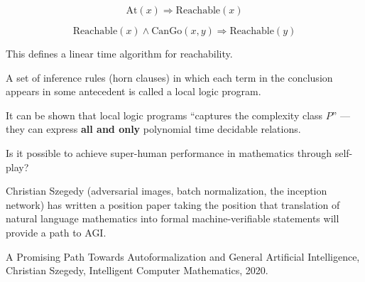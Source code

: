 {\vfill
$$\mathrm{At}(x) \Rightarrow \mathrm{Reachable}(x)$$

\vfill
$$\mathrm{Reachable}(x) \wedge \mathrm{CanGo}(x,y) \Rightarrow \mathrm{Reachable}(y)$$

\vfill
This defines a linear time algorithm for reachability.


A set of inference rules (horn clauses) in which each term in the conclusion appears in some antecedent is called a local logic program.

\vfill
It can be shown that local logic programs ``captures the complexity class $P$'' --- they can express {\bf all and only} polynomial time decidable relations.


Is it possible to achieve super-human performance in mathematics through self-play?


Christian Szegedy (adversarial images, batch normalization,  the inception network) has written a position paper
taking the position that translation of natural language mathematics into formal machine-verifiable statements will provide
a path to AGI.

\vfill
A Promising Path Towards Autoformalization and General Artificial Intelligence, Christian Szegedy, Intelligent Computer Mathematics, 2020.


}


